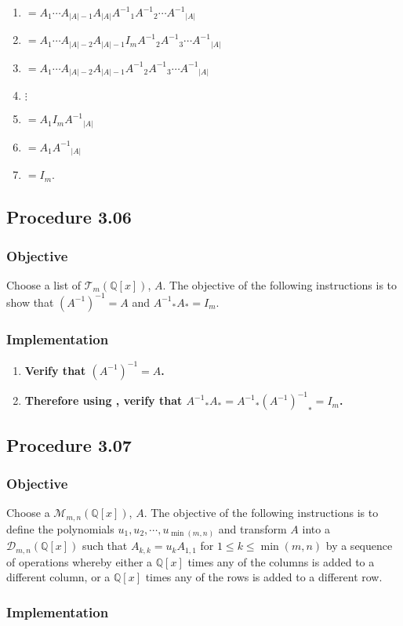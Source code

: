 \documentclass[twocolumn]{article}
\newcommand{\procedure}[2][]{\subsection*{Procedure #2 \ifthenelse{\equal{#1}{}}{}{(#1)}}\label{sec:procedure #2}}
\newcommand{\objective}{\subsubsection*{Objective}}
\newcommand{\implementation}{\subsubsection*{Implementation}}
\newcommand{\procedurehr}[2][]{\hyperref[sec:procedure #2]{\ifthenelse{\equal{#1}{}}{procedure #2}{#1}}}
\begin{document}
\begin{enumerate}
\begin{enumerate}
						\item $=A_1\cdots A_{\lvert A\rvert-1}A_{\lvert A\rvert}{A^{-1}}_1{A^{-1}}_2\cdots {A^{-1}}_{\lvert A\rvert}$
						\item $=A_1\cdots A_{\lvert A\rvert-2}A_{\lvert A\rvert-1}I_m{A^{-1}}_2{A^{-1}}_3\cdots {A^{-1}}_{\lvert A\rvert}$
						\item $=A_1\cdots A_{\lvert A\rvert-2}A_{\lvert A\rvert-1}{A^{-1}}_2{A^{-1}}_3\cdots {A^{-1}}_{\lvert A\rvert}$
						\item $\vdots$
						\item $=A_1I_m{A^{-1}}_{\lvert A\rvert}$
						\item $=A_1{A^{-1}}_{\lvert A\rvert}$
						\item $=I_m$.
					\end{enumerate}
				\end{enumerate}
		\procedure{3.06}
			\objective
				Choose a list of $\mathcal{T}_{m}(\mathbb{Q}[x])$, $A$. The objective of the following instructions is to show that $(A^{-1})^{-1}=A$ and ${A^{-1}}_*A_*=I_m$.
			\implementation
				\begin{enumerate}
					\item \textbf{Verify that $(A^{-1})^{-1}=A$.}
					\item \textbf{Therefore using \procedurehr{3.05}, verify that ${A^{-1}}_*A_*={A^{-1}}_*{(A^{-1})^{-1}}_*=I_m$.}
				\end{enumerate}
		\procedure{3.07}
			\objective
				Choose a $\mathcal{M}_{m,n}(\mathbb{Q}[x])$, $A$. The objective of the following instructions is to define the polynomials $u_1,u_2,\cdots,u_{\min(m,n)}$ and transform $A$ into a $\mathcal{D}_{m,n}(\mathbb{Q}[x])$ such that $A_{k,k}=u_kA_{1,1}$ for $1\le k\le\min(m,n)$ by a sequence of operations whereby either a $\mathbb{Q}[x]$ times any of the columns is added to a different column, or a $\mathbb{Q}[x]$ times any of the rows is added to a different row.
			\implementation
\end{document}
